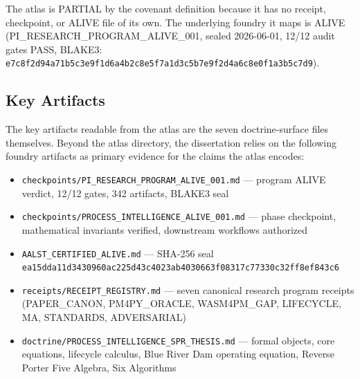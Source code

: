 The atlas is PARTIAL by the covenant definition because it has no receipt,
checkpoint, or ALIVE file of its own. The underlying foundry it maps is ALIVE
(PI\_RESEARCH\_PROGRAM\_ALIVE\_001, sealed 2026-06-01, 12/12 audit gates PASS,
BLAKE3: \texttt{e7c8f2d94a71b5c3e9f1d6a4b2c8e5f7a1d3c5b7e9f2d4a6c8e0f1a3b5c7d9}).

\subsection{Key Artifacts}
\label{sec:atlas-identity-artifacts}

The key artifacts readable from the atlas are the seven doctrine-surface files
themselves. Beyond the atlas directory, the dissertation relies on the following
foundry artifacts as primary evidence for the claims the atlas encodes:

\begin{itemize}
  \item \texttt{checkpoints/PI\_RESEARCH\_PROGRAM\_ALIVE\_001.md} --- program
        ALIVE verdict, 12/12 gates, 342 artifacts, BLAKE3 seal
  \item \texttt{checkpoints/PROCESS\_INTELLIGENCE\_ALIVE\_001.md} --- phase
        checkpoint, mathematical invariants verified, downstream workflows
        authorized
  \item \texttt{AALST\_CERTIFIED\_ALIVE.md} --- SHA-256 seal
        \texttt{ea15dda11d3430960ac225d43c4023ab4030663f08317c77330c32ff8ef843c6}
  \item \texttt{receipts/RECEIPT\_REGISTRY.md} --- seven canonical research
        program receipts (PAPER\_CANON, PM4PY\_ORACLE, WASM4PM\_GAP, LIFECYCLE,
        MA, STANDARDS, ADVERSARIAL)
  \item \texttt{doctrine/PROCESS\_INTELLIGENCE\_SPR\_THESIS.md} --- formal
        objects, core equations, lifecycle calculus, Blue River Dam operating
        equation, Reverse Porter Five Algebra, Six Algorithms
\end{itemize}
